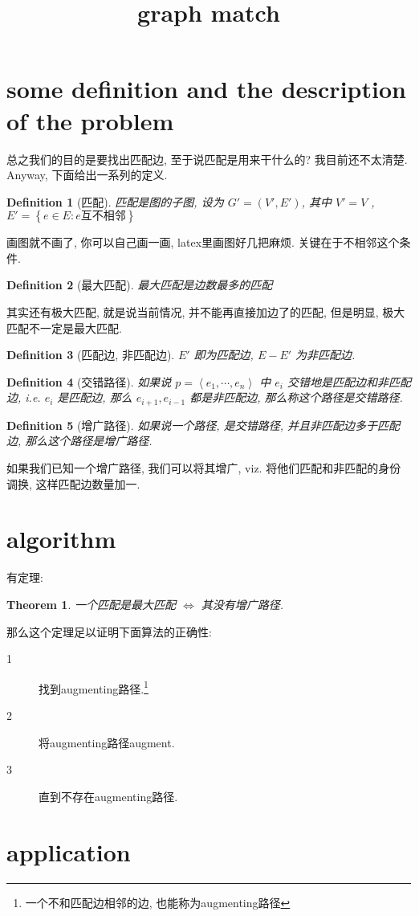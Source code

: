 \documentclass[a4paper, 10pt]{ctexart} %
\title{graph match}
\newtheorem{theorem}{Theorem}
\newtheorem{definition}{Definition}
\begin{document}
\tableofcontents
\maketitle
\section{some definition and the description of the problem}

总之我们的目的是要找出匹配边, 至于说匹配是用来干什么的? 我目前还不太清楚. Anyway, 下面给出一系列的定义. 

\begin{definition}[匹配]
匹配是图的子图, 设为 $G' = \left(V' , E'\right)$, 其中 $V' = V$ , $E ' = \left\{e \in E : e \text{互不相邻}\right\}$
\end{definition}
画图就不画了, 你可以自己画一画, latex里画图好几把麻烦. 关键在于不相邻这个条件. 
\begin{definition}[最大匹配]
最大匹配是边数最多的匹配
\end{definition}
其实还有极大匹配, 就是说当前情况, 并不能再直接加边了的匹配, 但是明显, 极大匹配不一定是最大匹配. 
\begin{definition}[匹配边, 非匹配边]
$E' $ 即为匹配边, $E - E' $ 为非匹配边.
\end{definition}
\begin{definition}[交错路径]
如果说 $p = \left< e_1, \cdots  , e_{n}\right>$ 中 $e_{i}$ 交错地是匹配边和非匹配边, i.e.  $e_{i}$ 是匹配边, 那么 $e_{i+1}, e_{i-1}$ 都是非匹配边, 那么称这个路径是交错路径.
\end{definition}
\begin{definition}[增广路径]
如果说一个路径, 是交错路径, 并且非匹配边多于匹配边, 那么这个路径是增广路径.
\end{definition}

如果我们已知一个增广路径, 我们可以将其增广, viz. 将他们匹配和非匹配的身份调换, 这样匹配边数量加一.
\section{algorithm}
有定理: 
\begin{theorem}
一个匹配是最大匹配 $\iff $ 其没有增广路径.
\end{theorem}
那么这个定理足以证明下面算法的正确性:
\begin{description}
    \item[1] 找到augmenting路径.\footnote{一个不和匹配边相邻的边, 也能称为augmenting路径} 
    \item[2] 将augmenting路径augment. 
    \item[3] 直到不存在augmenting路径.
\end{description}

\section{application}
\end{document}

